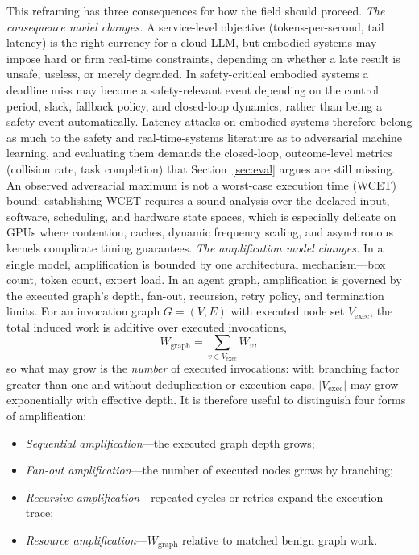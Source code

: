 \documentclass[acmsmall,screen,review,nonacm]{acmart}
\begin{document}
This reframing has three consequences for how the field should proceed. \emph{The consequence model changes.} A service-level objective (tokens-per-second, tail latency) is the right currency for a cloud LLM, but embodied systems may impose hard or firm real-time constraints, depending on whether a late result is unsafe, useless, or merely degraded. In safety-critical embodied systems a deadline miss may become a safety-relevant event depending on the control period, slack, fallback policy, and closed-loop dynamics, rather than being a safety event automatically. Latency attacks on embodied systems therefore belong as much to the safety and real-time-systems literature as to adversarial machine learning, and evaluating them demands the closed-loop, outcome-level metrics (collision rate, task completion) that Section~\ref{sec:eval} argues are still missing. An observed adversarial maximum is not a worst-case execution time (WCET) bound: establishing WCET requires a sound analysis over the declared input, software, scheduling, and hardware state spaces, which is especially delicate on GPUs where contention, caches, dynamic frequency scaling, and asynchronous kernels complicate timing guarantees. \emph{The amplification model changes.} In a single model, amplification is bounded by one architectural mechanism---box count, token count, expert load. In an agent graph, amplification is governed by the executed graph's depth, fan-out, recursion, retry policy, and termination limits. For an invocation graph $G=(V,E)$ with executed node set $V_{\mathrm{exec}}$, the total induced work is additive over executed invocations,
\begin{equation}
W_{\mathrm{graph}}=\sum_{v\in V_{\mathrm{exec}}} W_v,
\end{equation}
so what may grow is the \emph{number} of executed invocations: with branching factor greater than one and without deduplication or execution caps, $|V_{\mathrm{exec}}|$ may grow exponentially with effective depth. It is therefore useful to distinguish four forms of amplification:
\begin{itemize}
\item \emph{Sequential amplification}---the executed graph depth grows;
\item \emph{Fan-out amplification}---the number of executed nodes grows by branching;
\item \emph{Recursive amplification}---repeated cycles or retries expand the execution trace;
\item \emph{Resource amplification}---$W_{\mathrm{graph}}$ relative to matched benign graph work.
\end{itemize}
\end{document}
